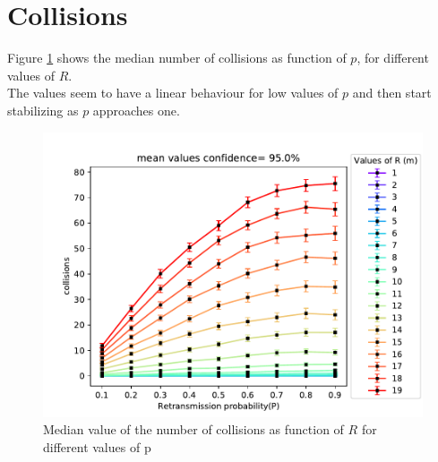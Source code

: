 \section{Collisions}
Figure \ref{fig:collisionsPR} shows the median number of collisions as function of $p$, for different values of $R$.\\
The values seem to have a linear behaviour for low values of $p$ and then start stabilizing as $p$ approaches one.
\begin{figure}[H]
    \begin{center}
        \includegraphics[scale=.7]{img/big_collisions_p_mean_95.0.pdf}
    \end{center}
    \vspace*{-0.5cm}
    \caption{Median value of the number of collisions as function of $R$ for different values of p}
    \label{fig:collisionsPR}
\end{figure}

